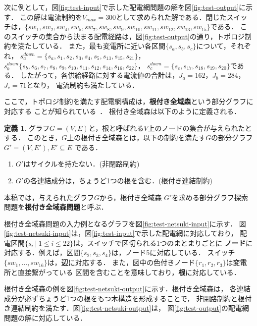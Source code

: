 次に例として，図\ref{fig:test-input}で示した配電網問題の解を図\ref{fig:test-output}に示す．
この解は電流制約を$V_{max}=300$として求められた解である．閉じたスイッチは，$\{sw_{1},sw_{2},
sw_{4},sw_{5},sw_{7},sw_{8},sw_{9},sw_{10},sw_{11},sw_{12},sw_{13},sw_{15}\}$である．
このスイッチの集合から決まる配電経路は，図\ref{fig:test-output}の通り，トポロジ制約を満たしている．
また，最も変電所に近い各区間$\{s_a,s_b,s_c\}$について，それぞれ，
$s_a^{down}=\{s_a,s_1,s_2,s_3,s_4,s_5,s_{13},s_{15},s_{21}\}$，
$s_b^{down}\{s_b,s_6,s_7,s_8,s_9,s_{10},s_{11},s_{12},s_{14},s_{16},s_{22}\}$，
$s_c^{down}=\{s_c,s_{17},s_{18},s_{19},s_{20}\}$である．
したがって，各供給経路に対する電流値の合計は，$J_a=162$，$J_b=284$，$J_c=71$となり，
電流制約も満たしている．

ここで，トポロジ制約を満たす配電網構成は，\textbf{根付き全域森}という部分グラフに対応する
ことが知られている~\cite{Minato:dnet:netuki}．
根付き全域森は以下のように定義される．
\theoremstyle{definition}
\newtheorem*{definition*}{定義}
\begin{definition*}
  グラフ$G=(V,E)$と，根と呼ばれる$V$上のノードの集合が与えられたとする．
  このとき，$G$上の根付き全域森とは，以下の制約を満たす$G$の部分グラフ
  $G'=(V,E'), E' \subseteq E$ である．
  \begin{enumerate}
  \item $G'$はサイクルを持たない．(非閉路制約)
  \item $G'$の各連結成分は，ちょうど1つの根を含む．(根付き連結制約)
  \end{enumerate}
本稿では，与えられたグラフ$G$から，根付き全域森
$G'$を求める部分グラフ探索問題を\textbf{根付き全域森問題}と呼ぶ．
\end{definition*}

根付き全域森問題の入力例となるグラフを図\ref{fig:test-netsuki-input}に示す．
図\ref{fig:test-netsuki-input}は，図\ref{fig:test-input}で示した配電網に対応しており，
配電区間$\{s_i ~|~ 1 \leq i \leq 22\}$は，スイッチで区切られる1つのまとまりごとに
\textbf{ノード}に対応する．例えば，区間$\{s_2,s_3,s_4\}$は，ノード5に対応している．
スイッチ$\{sw_1,\ldots,sw_{16}\}$は，\textbf{辺}に対応する．
また，図中の色付きノード$\{r_1,r_2,r_3\}$は変電所と直接繋がっている
区間を含むことを意味しており，\textbf{根}に対応している．

根付き全域森の例を図\ref{fig:test-netsuki-output}に示す．根付き全域森は，
各連結成分が必ずちょうど1つの根をもつ木構造を形成することで，
非閉路制約と根付き連結制約を満たす．図\ref{fig:test-netsuki-output}は，
図\ref{fig:test-output}の配電網問題の解に対応している．

